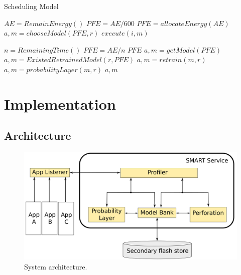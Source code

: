 \documentclass[pageno]{jpaper}
\begin{document}
\begin{algorithm}
 \caption{Scheduling Model}
  \begin{algorithmic}[1]
        \State $AE = RemainEnergy()$    
            \State $PFE = AE / 600 $ 
                \State $PFE = allocateEnergy(AE)$
        \EndIf
            \State $a, m = chooseModel(PFE, r)$  
            \State $execute(i,m)$        
    \EndFunction

        \State $n = RemainingTime()$
        \State $PFE = AE/n$
        \State \Return $PFE$
    \EndFunction
            \State $a, m = getModel(PFE)$ 
            \State $a,m = ExistedRetrainedModel(r, PFE)$
                    \State $a,m = retrain(m,r)$
                \Else
                    \State $a,m = probabilityLayer(m,r)$
                \EndIf
            \EndIf
        \EndIf
        \State \Return $a,m$
    \EndFunction

    
\end{algorithmic}
\end{algorithm}




\section{Implementation}
\subsection{Architecture}

\begin{figure} 
\includegraphics[scale=0.095]{architecture.png}
\caption{System architecture.}
\label{fig:Architecture}
\end{figure}
\end{document}
